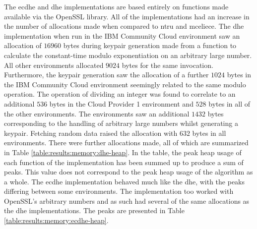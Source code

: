 The \gls{ecdhe} and \gls{dhe} implementations are based entirely on functions made available via the OpenSSL library. All of the implementations had an increase in the number of allocations made when compared to \gls{ntru} and \gls{mceliece}. The \gls{dhe} implementation when run in the IBM Community Cloud environment saw an allocation of $16960$ bytes during keypair generation made from a function to calculate the constant-time modulo exponentiation on an arbitrary large number. All other environments allocated $9024$ bytes for the same invocation. Furthermore, the keypair generation saw the allocation of a further $1024$ bytes in the IBM Community Cloud environment seemingly related to the same modulo operation.
The operation of dividing an integer was found to correlate to an additional $536$ bytes in the Cloud Provider 1 environment and $528$ bytes in all of the other environments. The environments saw an additional $1432$ bytes corresponding to the handling of arbitrary large numbers whilst generating a keypair. Fetching random data raised the allocation with $632$ bytes in all environments. There were further allocations made, all of which are summarized in Table \ref{table:results:memory:dhe-heap}. In the table, the peak heap usage of each function of the implementation has been summed up to produce a sum of peaks. This value does not correspond to the peak heap usage of the algorithm as a whole. The \gls{ecdhe} implementation behaved much like the \gls{dhe}, with the peaks differing between some environments. The implementation too worked with OpenSSL's arbitrary numbers and as such had several of the same allocations as the \gls{dhe} implementations. The peaks are presented in Table \ref{table:results:memory:ecdhe-heap}.

